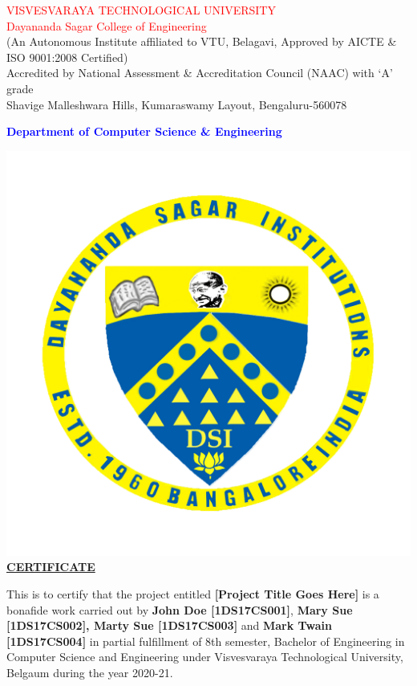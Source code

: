 \documentclass[ 12pt,a4paper,twocolumn,fleqn]{article}
\begin{document}
\begin{center}
\textcolor{red}{\LARGE{VISVESVARAYA TECHNOLOGICAL UNIVERSITY}} \\
\textcolor{red}{\LARGE{Dayananda Sagar College of Engineering}} \\
\footnotesize{(An Autonomous Institute affiliated to VTU, Belagavi, Approved by AICTE \& ISO 9001:2008 Certified)} \\
\footnotesize{Accredited by National Assessment \& Accreditation Council (NAAC) with ‘A’ grade}  \\
\footnotesize{Shavige Malleshwara Hills, Kumaraswamy Layout, Bengaluru-560078} \\
\begin{flushleft}
\textcolor{blue}{\LARGE{\textbf{Department of Computer Science \& Engineering}}} \\
\end{flushleft}
\includegraphics[scale=0.4]{media/DSCE-min.png} \\
\Large{\underline{\textbf{CERTIFICATE}}} \\
  \end{center}
\normalsize
This is to certify that the project entitled \textbf{[Project Title Goes Here]} is a bonafide work carried out by \textbf{John Doe [1DS17CS001]}, \textbf{Mary Sue [1DS17CS002], Marty Sue [1DS17CS003]} and \textbf{Mark Twain [1DS17CS004]} in partial fulfillment of 8th semester, Bachelor of Engineering in Computer Science and Engineering under Visvesvaraya Technological University, Belgaum during the year 2020-21. \\
\end{document}
